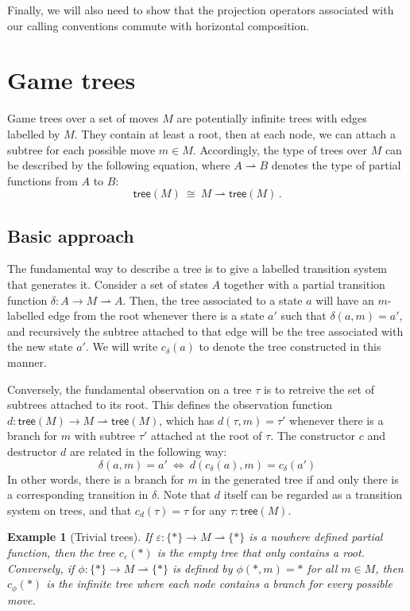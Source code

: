 \documentclass[11pt]{article}
\newcommand{\kw}[1]{{\mathsf{#1}}}
\newtheorem{example}{Example}
\begin{document}
Finally, we will also need to show that the projection operators
associated with our calling conventions
commute with horizontal composition.


\section{Game trees}

Game trees over a set of moves $M$
are potentially infinite trees with
edges labelled by $M$.
They contain at least a root,
then at each node,
we can attach a subtree
for each possible move $m \in M$.
Accordingly,
the type of trees over $M$ can be described by the following equation,
where $A \rightharpoonup B$ denotes the type of
partial functions from $A$ to $B$:
\[
    \kw{tree}(M) \:\cong\: M \rightharpoonup \kw{tree}(M) \,.
\]

\subsection{Basic approach}

The fundamental way to describe a tree is to
give a labelled transition system that generates it.
Consider a set of states $A$ together with
a partial transition function $\delta : A \rightarrow M \rightharpoonup A$.
Then, the tree associated to a state $a$
will have an $m$-labelled edge from the root
whenever there is a state $a'$ such that $\delta(a, m) = a'$,
and recursively the subtree attached to that edge
will be the tree associated with the new state $a'$.
We will write $c_\delta(a)$ to denote
the tree constructed in this manner.

Conversely,
the fundamental observation on a tree $\tau$
is to retreive the set of subtrees attached to its root.
This defines the observation function
$d : \kw{tree}(M) \rightarrow M \rightharpoonup \kw{tree}(M)$,
which has $d(\tau, m) = \tau'$
whenever there is a branch for $m$ with subtree $\tau'$
attached at the root of $\tau$.
The constructor $c$ and destructor $d$ are related in the following way:
\[
  \delta(a, m) = a' \:\Leftrightarrow\: d(c_\delta(a), m) = c_\delta(a')
\]
In other words,
there is a branch for $m$ in the generated tree
if and only there is a corresponding transition in $\delta$. 
Note that $d$ itself can be regarded as a transition system on trees,
and that $c_d(\tau) = \tau$ for any $\tau : \kw{tree}(M)$.

\begin{example}[Trivial trees]
If $\varepsilon : \{*\} \rightarrow M \rightharpoonup \{*\}$
is a nowhere defined partial function,
then the tree $c_\varepsilon(*)$
is the empty tree that only contains a root.
Conversely,
if $\phi : \{*\} \rightarrow M \rightharpoonup \{*\}$
is defined by $\phi(*, m) = *$ for all $m \in M$,
then $c_\phi(*)$ is the infinite tree
where each node contains a branch for every possible move.
\end{example}
\end{document}
